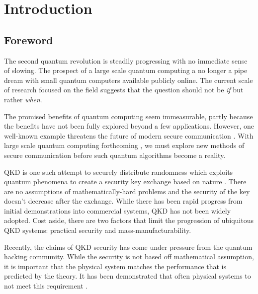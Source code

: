 %
%
\graphicspath{{./chapters/chapter01/fig01/}}

\let\textcircled=\pgftextcircled
\chapter{Introduction}
\label{chap:intro}

\section{Foreword}

The second quantum revolution is steadily progressing with no immediate sense of slowing. The prospect of a large scale quantum computing a no longer a pipe dream with small quantum computers available publicly online. The current scale of research focused on the field suggests that the question should not be \emph{if} but rather \emph{when}. 

The promised benefits of quantum computing seem immeasurable, partly because the benefits have not been fully explored beyond a few applications. However, one well-known example threatens the future of modern secure communication \cite{shor1994}. With large scale quantum computing forthcoming \cite{arute2019quantum}, we must explore new methods of secure communication before such quantum algorithms become a reality.


 \Ac{QKD} is one such attempt to securely distribute randomness which exploits quantum phenomena to create a security key exchange based on nature \cite{BB84, E91}. There are no assumptions of mathematically-hard problems and the security of the key doesn't decrease after the exchange. While there has been rapid progress from initial demonstrations into commercial systems, \ac{QKD} has not been widely adopted. Cost aside, there are two factors that limit the progression of ubiquitous \ac{QKD} systems: practical security and mass-manufacturability. 

Recently, the claims of \ac{QKD} security has come under pressure from the quantum hacking community. While the security is not based off mathematical assumption, it is important that the physical system matches the performance that is predicted by the theory. It has been demonstrated that often physical systems to not meet this requirement \cite{}.

